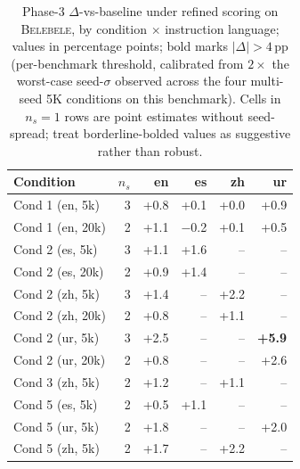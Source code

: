 \begin{table}[t]
  \centering
  \small
  \begin{tabular}{lrrrrr}
    \toprule
    Condition & $n_s$ & en & es & zh & ur \\
    \midrule
    Cond 1 (en, 5k) & 3 & +0.8 & +0.1 & +0.0 & +0.9 \\
    Cond 1 (en, 20k) & 2 & +1.1 & $-$0.2 & +0.1 & +0.5 \\
    Cond 2 (es, 5k) & 3 & +1.1 & +1.6 & -- & -- \\
    Cond 2 (es, 20k) & 2 & +0.9 & +1.4 & -- & -- \\
    Cond 2 (zh, 5k) & 3 & +1.4 & -- & +2.2 & -- \\
    Cond 2 (zh, 20k) & 2 & +0.8 & -- & +1.1 & -- \\
    Cond 2 (ur, 5k) & 3 & +2.5 & -- & -- & \textbf{+5.9} \\
    Cond 2 (ur, 20k) & 2 & +0.8 & -- & -- & +2.6 \\
    Cond 3 (zh, 5k) & 2 & +1.2 & -- & +1.1 & -- \\
    Cond 5 (es, 5k) & 2 & +0.5 & +1.1 & -- & -- \\
    Cond 5 (ur, 5k) & 2 & +1.8 & -- & -- & +2.0 \\
    Cond 5 (zh, 5k) & 2 & +1.7 & -- & +2.2 & -- \\
    \bottomrule
  \end{tabular}
  \caption{Phase-3 $\Delta$-vs-baseline under refined scoring on \textsc{Belebele}, by condition $\times$ instruction language; values in percentage points; bold marks $|\Delta| > 4$\,pp (per-benchmark threshold, calibrated from $2 \times$ the worst-case seed-$\sigma$ observed across the four multi-seed 5K conditions on this benchmark). Cells in $n_s\!=\!1$ rows are point estimates without seed-spread; treat borderline-bolded values as suggestive rather than robust.}
  \label{tab:t4-belebele-delta}
\end{table}


